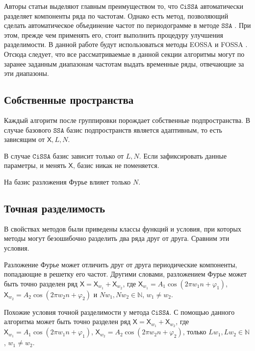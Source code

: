 \documentclass[12pt, specialist, subf
]{disser}
\theoremstyle{definition}
\newcommand{\SSA}{\texttt{SSA}}
\newcommand{\CISSA}{\texttt{CiSSA}}
\newcommand{\TS}{\mathsf{X}}
\begin{document}
\label{subsubsec:autogroup}

Авторы статьи \cite{bogalo2020} выделяют главным преимуществом то, что $\CISSA$ автоматически разделяет компоненты ряда по частотам. Однако есть метод, позволяющий сделать автоматическое объединение частот по периодограмме в методе $\SSA$
\cite{golyandina2023automatedidentificationsingularspectrum}
. При этом, прежде чем применять его, стоит выполнить процедуру улучшения разделимости. В данной работе будут использоваться методы EOSSA и FOSSA \cite{golyandina2023intelligent}. Отсюда следует, что все рассматриваемые в данной секции алгоритмы могут по заранее заданным диапазонам частотам выдать временные ряды, отвечающие за эти диапазоны.



\subsection{Собственные пространства}
Каждый алгоритм после группировки порождает собственные подпространства. В случае базового $\SSA$ базис подпространств является адаптивным, то есть зависящим от $\TS, L, N$.

В случае $\CISSA$ базис зависит только от $L, N$. Если зафиксировать данные параметры, и менять $\TS$, базис никак не поменяется.

На базис разложения Фурье влияет только $N$.


\subsection{Точная разделимость}
\label{subsubsec:exact}

В свойствах методов были приведены классы функций и условия, при которых методы могут безошибочно разделить два ряда друг от друга. Сравним эти условия.

Разложение Фурье может отличить друг от друга периодические компоненты, попадающие в решетку его частот. Другими словами, разложением Фурье может быть точно разделен ряд $\TS = \TS_{w_1} + \TS_{w_2}$, где $\TS_{w_1} = A_1 \cos(2\pi w_1 n + \varphi_1)$, $\TS_{w_2} = A_2 \cos(2\pi w_2 n + \varphi_2)$ и $Nw_1, Nw_2 \in \mathbb{N}$, $w_1 \not = w_2$.

Похожие условия точной разделимости у метода $\CISSA$. С помощью данного алгоритма может быть точно разделен ряд $\TS = \TS_{w_1} + \TS_{w_2}$, где $\TS_{w_1} = A_1 \cos(2\pi w_1 n + \varphi_1)$, $\TS_{w_2} = A_2 \cos(2\pi w_2 n + \varphi_2)$, только $Lw_1, Lw_2 \in \mathbb{N}$, $w_1 \not = w_2$.
\end{document}
